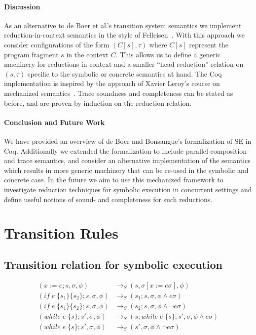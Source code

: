 \documentclass[submission,copyright,creativecommons]{eptcs}
\begin{document}
\paragraph{Discussion}
As an alternative to de Boer et al.'s transition system semantics we implement reduction-in-context semantics in the
style of Felleisen~\cite{FELLEISEN1992235}.
With this approach we consider configurations of the form $(C[s], \tau)$ where $C[s]$ represent the program fragment
$s$ in the context $C$. This allows us to define a generic machinery for reductions in context and a smaller
``head reduction'' relation on $(s, \tau)$ specific to the symbolic or concrete semantics at hand.
The Coq implementation is inspired by the approach of Xavier Leroy's course on mechanized semantics~\cite{Leroy2020}.
Trace soundness and completeness can be stated as before, and are proven by induction on the reduction relation.

\paragraph{Conclusion and Future Work}
We have provided an overview of de Boer and Bonsangue's formalization of SE in Coq.
Additionally we extended the formalization to include parallel composition and trace semantics,
and consider an alternative implementation of the semantics which results in more generic machinery
that can be re-used in the symbolic and concrete case.
In the future we aim to use this mechanized framework to investigate reduction techniques for symbolic
execution in concurrent settings and define useful notions of sound- and completeness for such reductions.




\appendix
\section{Transition Rules}

\subsection{Transition relation for symbolic execution}
\begin{align*}
(x := e ; s, \sigma, \phi) & \rightarrow_{S} (s, \sigma[x := e\sigma], \phi) \\
(if \;e\; \{s_{1}\} \{s_{2}\} ; s, \sigma, \phi) & \rightarrow_{S} (s_{1} ; s, \sigma, \phi \land e\sigma) \\
(if \;e\; \{s_{1}\} \{s_{2}\} ; s, \sigma, \phi) & \rightarrow_{S} (s_{2} ; s, \sigma, \phi \land \neg e\sigma) \\
(while \;e\; \{s\} ; s', \sigma, \phi) & \rightarrow_{S} ( s ; while \;e\; \{s\} ; s', \sigma, \phi \land e\sigma) \\
(while \;e\; \{s\} ; s', \sigma, \phi) & \rightarrow_{S} (s', \sigma, \phi \land \neg e\sigma)
\end{align*}
\end{document}
